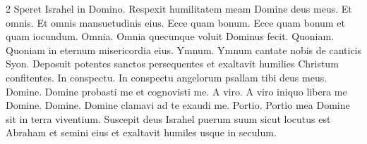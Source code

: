 \begin{multicols*}{2}
 Speret Israhel in Domino.
 Respexit humilitatem meam Domine deus meus.
 Et omnis.
 Et omnis mansuetudinis eius.
 Ecce quam bonum.
 Ecce quam bonum et quam iocundum.
 Omnia.
 Omnia quecunque voluit Dominus fecit.
 Quoniam.
 Quoniam in eternum misericordia eius.
 Ymnum.
 Ymnum cantate nobis de canticis Syon.
 Deposuit potentes sanctos persequentes et exaltavit humilies Christum confitentes.
 In conspectu.
 In conspectu angelorum psallam tibi deus meus.
 Domine.
 Domine probasti me et cognovisti me.
 A viro.
 A viro iniquo libera me Domine.
 Domine.
 Domine clamavi ad te exaudi me.
 Portio.
 Portio mea Domine sit in terra viventium.
 Suscepit deus Israhel puerum suum sicut locutus est Abraham et semini eius et exaltavit humiles usque in seculum.

\end{multicols*}
